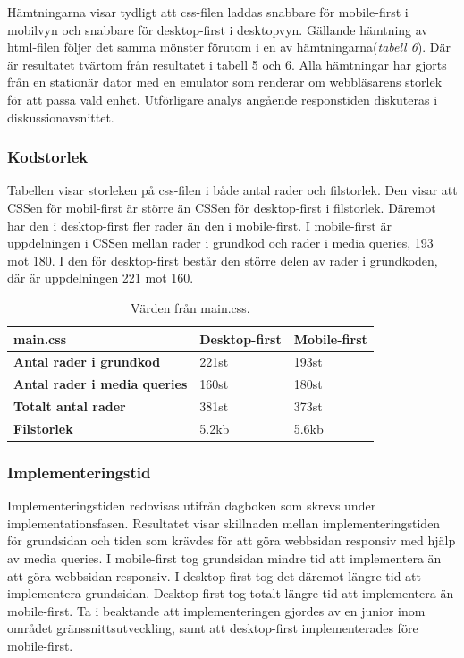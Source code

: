 \documentclass[11pt]{article}
\begin{document}
Hämtningarna visar tydligt att css-filen laddas snabbare för mobile-first i mobilvyn och snabbare för desktop-first i desktopvyn. Gällande hämtning av html-filen följer det samma mönster förutom i en av hämtningarna(\textit{tabell 6}). Där är resultatet tvärtom från resultatet i tabell 5 och 6. Alla hämtningar har gjorts från en stationär dator med en emulator som renderar om webbläsarens storlek för att passa vald enhet. Utförligare analys angående responstiden diskuteras i diskussionavsnittet.

\subsubsection{Kodstorlek}

Tabellen visar storleken på css-filen i både antal rader och filstorlek. Den visar att CSSen för mobil-first är större än CSSen för desktop-first i filstorlek. Däremot har den i desktop-first fler rader än den i mobile-first. I mobile-first är uppdelningen i CSSen mellan rader i grundkod och rader i media queries, 193 mot 180. I den för desktop-first består den större delen av rader i grundkoden, där är uppdelningen 221 mot 160.

\begin{table}[H]
	\centering
	\begin{tabular}{|p{6cm}|p{2.7cm}|p{2.4cm}|}
	\hline
	\textbf{main.css}&\textbf{Desktop-first}&\textbf{Mobile-first}\\ \hline
	\textbf{Antal rader i grundkod}&221st&193st\\ \hline
	\textbf{Antal rader i media queries}&160st&180st\\ \hline
	\textbf{Totalt antal rader}&381st&373st\\ \hline
	\textbf{Filstorlek}&5.2kb&5.6kb\\ \hline
	\end{tabular}
    \caption {Värden från main.css.}
\end{table}

\subsubsection{Implementeringstid}

Implementeringstiden redovisas utifrån dagboken som skrevs under implementationsfasen. Resultatet visar skillnaden mellan implementeringstiden för grundsidan och tiden som krävdes för att göra webbsidan responsiv med hjälp av media queries. I mobile-first tog grundsidan mindre tid att implementera än att göra webbsidan responsiv. I desktop-first tog det däremot längre tid att implementera grundsidan. Desktop-first tog totalt längre tid att implementera än mobile-first. Ta i beaktande att implementeringen gjordes av en junior inom området gränssnittsutveckling, samt att desktop-first implementerades före mobile-first.
\end{document}
